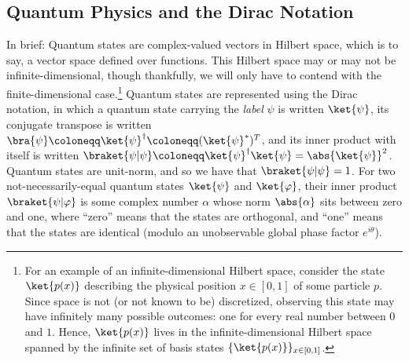   \subsection{Quantum Physics and the Dirac Notation}\label{sec:dirac}
    In brief: Quantum states are complex-valued vectors in Hilbert space,
      which is to say, a vector space defined over functions. This Hilbert space
      may or may not be infinite-dimensional, though thankfully, we will only have
      to contend with the finite-dimensional case.\footnote{
        For an example of an infinite-dimensional Hilbert space, consider the
        state $\ket{p(x)}$ describing the physical position $x \in [0,1]$ of some
        particle $p$. Since space is not (or not known to be) discretized,
        observing this state may have infinitely
        many possible outcomes: one for every real number between $0$ and $1$. Hence, $\ket{p(x)}$ lives
        in the infinite-dimensional Hilbert space spanned by the infinite set of basis
        states $\{\ket{p(x)}\}_{x\in[0,1]}$.
      }
    Quantum states are represented using the Dirac notation, in which a quantum state
      carrying the \emph{label} $\psi$ is written $\ket{\psi}$, its conjugate
      transpose is written $\bra{\psi} \coloneqq \ket{\psi}^\dagger \coloneqq
      (\ket{\psi}^*)^T$, and its
      inner product with itself is written $\braket{\psi|\psi} \coloneqq
      \ket{\psi}^\dagger \ket{\psi} = \abs{\ket{\psi}}^2$. Quantum states are unit-norm, and so we have that
      $\braket{\psi|\psi} = 1$. For two not-necessarily-equal quantum states
      $\ket{\psi}$ and $\ket{\varphi}$, their inner product
      $\braket{\psi|\varphi}$ is some complex number $\alpha$ whose norm
      $\abs{\alpha}$ sits between zero and one, where
      ``zero'' means that the states are orthogonal, and ``one'' means that the
      states are identical (modulo an unobservable global phase factor $e^{i\theta}$).

